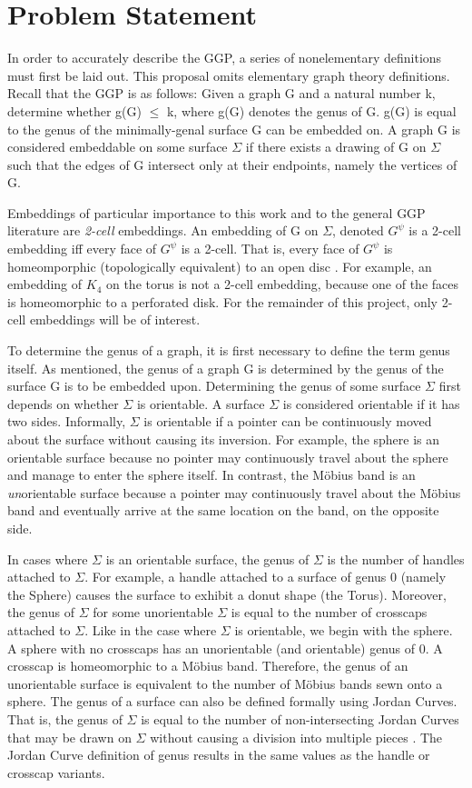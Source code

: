 \documentclass[12pt,conference]{IEEEtran}
\begin{document}
\section{Problem Statement}

In order to accurately describe the GGP, a series of nonelementary definitions must first be laid out. This proposal omits elementary graph theory definitions.
Recall that the GGP is as follows: Given a graph G and a natural number k, determine whether g(G) $\leq$ k, where g(G) denotes the genus of G. g(G) is equal to the genus of the minimally-genal surface G can be embedded on. A graph G is considered embeddable on some surface $\Sigma$ if there exists a drawing of G on $\Sigma$ such that the edges of G intersect only at their endpoints, namely the vertices of G. 

Embeddings of particular importance to this work and to the general GGP literature are \textit{2-cell} embeddings. An embedding of G on $\Sigma$, denoted $G^{\psi}$ is a 2-cell embedding iff every face of $G^{\psi}$ is a 2-cell. That is, every face of $G^{\psi}$ is homeomporphic (topologically equivalent) to an open disc \cite{gao}. For example, an embedding of $K_{4}$ on the torus is not a 2-cell embedding, because one of the faces is homeomorphic to a perforated disk. For the remainder of this project, only 2-cell embeddings will be of interest. 

To determine the genus of a graph, it is first necessary to define the term genus itself. As mentioned, the genus of a graph G is determined by the genus of the surface G is to be embedded upon. Determining the genus of some surface $\Sigma$ first depends on whether $\Sigma$ is orientable. A surface $\Sigma$ is considered orientable if it has two sides. Informally, $\Sigma$ is orientable if a pointer can be continuously moved about the surface without causing its inversion. For example, the sphere is an orientable surface because no pointer may continuously travel about the sphere and manage to enter the sphere itself. In contrast, the M\"obius band is an \textit{un}orientable surface because a pointer may continuously travel about the M\"obius band and eventually arrive at the same location on the band, on the opposite side.
  
In cases where $\Sigma$ is an orientable surface, the genus of $\Sigma$ is the number of handles attached to $\Sigma$. For example, a handle attached to a surface of genus 0 (namely the Sphere) causes the surface to exhibit a donut shape (the Torus). Moreover, the genus of $\Sigma$ for some unorientable $\Sigma$ is equal to the number of crosscaps attached to $\Sigma$. Like in the case where $\Sigma$ is orientable, we begin with the sphere. A sphere with no crosscaps has an unorientable (and orientable) genus of 0. A crosscap is homeomorphic to a M\"obius band. Therefore, the genus of an unorientable surface is equivalent to the number of M\"obius bands sewn onto a sphere. The genus of a surface can also be defined formally using Jordan Curves. That is, the genus of $\Sigma$ is equal to the number of non-intersecting Jordan Curves that may be drawn on $\Sigma$ without causing a division into multiple pieces \cite{gao}. The Jordan Curve definition of genus results in the same values as the handle or crosscap variants. 
\end{document}
